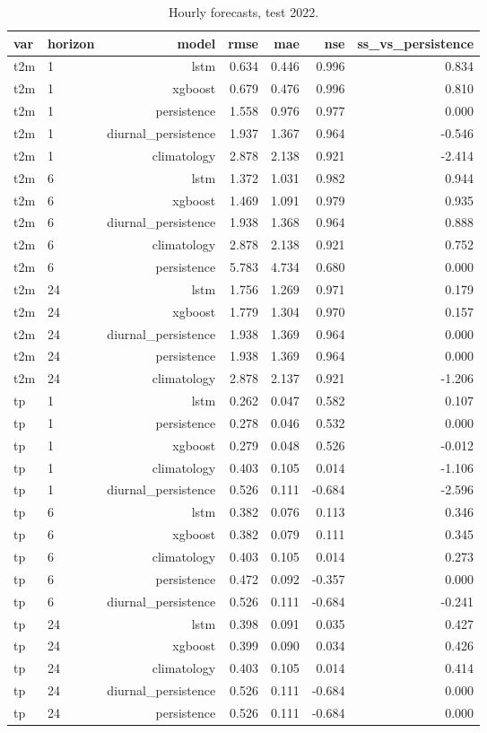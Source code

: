 \begin{table}[t]
\centering
\caption{Hourly forecasts, test 2022.}
\label{tab:hourly}
\begin{tabular}{llrrrrr}
\toprule
var & horizon & model & rmse & mae & nse & ss\_vs\_persistence \\
\midrule
t2m & 1 & lstm & 0.634 & 0.446 & 0.996 & 0.834 \\
t2m & 1 & xgboost & 0.679 & 0.476 & 0.996 & 0.810 \\
t2m & 1 & persistence & 1.558 & 0.976 & 0.977 & 0.000 \\
t2m & 1 & diurnal\_persistence & 1.937 & 1.367 & 0.964 & -0.546 \\
t2m & 1 & climatology & 2.878 & 2.138 & 0.921 & -2.414 \\
t2m & 6 & lstm & 1.372 & 1.031 & 0.982 & 0.944 \\
t2m & 6 & xgboost & 1.469 & 1.091 & 0.979 & 0.935 \\
t2m & 6 & diurnal\_persistence & 1.938 & 1.368 & 0.964 & 0.888 \\
t2m & 6 & climatology & 2.878 & 2.138 & 0.921 & 0.752 \\
t2m & 6 & persistence & 5.783 & 4.734 & 0.680 & 0.000 \\
t2m & 24 & lstm & 1.756 & 1.269 & 0.971 & 0.179 \\
t2m & 24 & xgboost & 1.779 & 1.304 & 0.970 & 0.157 \\
t2m & 24 & diurnal\_persistence & 1.938 & 1.369 & 0.964 & 0.000 \\
t2m & 24 & persistence & 1.938 & 1.369 & 0.964 & 0.000 \\
t2m & 24 & climatology & 2.878 & 2.137 & 0.921 & -1.206 \\
tp & 1 & lstm & 0.262 & 0.047 & 0.582 & 0.107 \\
tp & 1 & persistence & 0.278 & 0.046 & 0.532 & 0.000 \\
tp & 1 & xgboost & 0.279 & 0.048 & 0.526 & -0.012 \\
tp & 1 & climatology & 0.403 & 0.105 & 0.014 & -1.106 \\
tp & 1 & diurnal\_persistence & 0.526 & 0.111 & -0.684 & -2.596 \\
tp & 6 & lstm & 0.382 & 0.076 & 0.113 & 0.346 \\
tp & 6 & xgboost & 0.382 & 0.079 & 0.111 & 0.345 \\
tp & 6 & climatology & 0.403 & 0.105 & 0.014 & 0.273 \\
tp & 6 & persistence & 0.472 & 0.092 & -0.357 & 0.000 \\
tp & 6 & diurnal\_persistence & 0.526 & 0.111 & -0.684 & -0.241 \\
tp & 24 & lstm & 0.398 & 0.091 & 0.035 & 0.427 \\
tp & 24 & xgboost & 0.399 & 0.090 & 0.034 & 0.426 \\
tp & 24 & climatology & 0.403 & 0.105 & 0.014 & 0.414 \\
tp & 24 & diurnal\_persistence & 0.526 & 0.111 & -0.684 & 0.000 \\
tp & 24 & persistence & 0.526 & 0.111 & -0.684 & 0.000 \\
\bottomrule
\end{tabular}
\end{table}